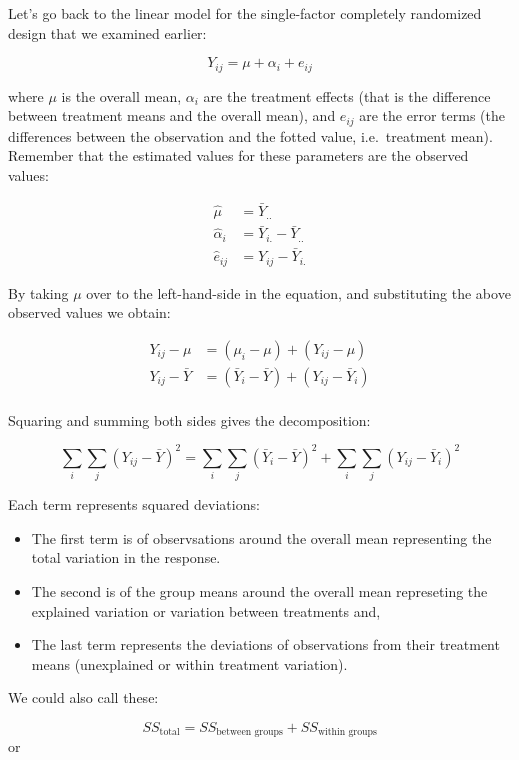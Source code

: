 \documentclass[
  letterpaper,
  DIV=11,
  numbers=noendperiod,
  oneside]{scrreprt}
\providecommand{\tightlist}{%
  \setlength{\itemsep}{0pt}\setlength{\parskip}{0pt}}\usepackage{longtable,booktabs,array}
\begin{document}
Let's go back to the linear model for the single-factor completely
randomized design that we examined earlier:

\[
Y_{ij} = \mu + \alpha_i + e_{ij}
\]

where \(\mu\) is the overall mean, \(\alpha_i\) are the treatment
effects (that is the difference between treatment means and the overall
mean), and \(e_{ij}\) are the error terms (the differences between the
observation and the fotted value, i.e.~treatment mean). Remember that
the estimated values for these parameters are the observed values:

\[
\begin{aligned}
\hat{\mu} &= \bar{Y}_{..} \\
\hat{\alpha}_i &= \bar{Y}_{i.} - \bar{Y}_{..}\\
\hat{e}_{ij} &= Y_{ij} -  \bar{Y}_{i.}
\end{aligned}
\]

By taking \(\mu\) over to the left-hand-side in the equation, and
substituting the above observed values we obtain:

\[
\begin{aligned}
Y_{ij} - \mu &= (\mu_i - \mu) + (Y_{ij} - \mu)\\
Y_{ij} - \bar{Y} &= (\bar{Y}_i - \bar{Y}) + (Y_{ij} - \bar{Y}_i) \\
\end{aligned}
\]

Squaring and summing both sides gives the decomposition:

\[
\sum_i \sum_j (Y_{ij} - \bar{Y})^2 = \sum_i \sum_j (\bar{Y}_i - \bar{Y})^2 + \sum_i \sum_j (Y_{ij} - \bar{Y}_i)^2
\]

Each term represents squared deviations:

\begin{itemize}
\tightlist
\item
  The first term is of observsations around the overall mean
  representing the total variation in the response.
\item
  The second is of the group means around the overall mean represeting
  the explained variation or variation between treatments and,
\item
  The last term represents the deviations of observations from their
  treatment means (unexplained or within treatment variation).
\end{itemize}

We could also call these:

\[
SS_{\text{total}} = SS_{\text{between groups}} + SS_{\text{within groups}}
\] or
\end{document}
